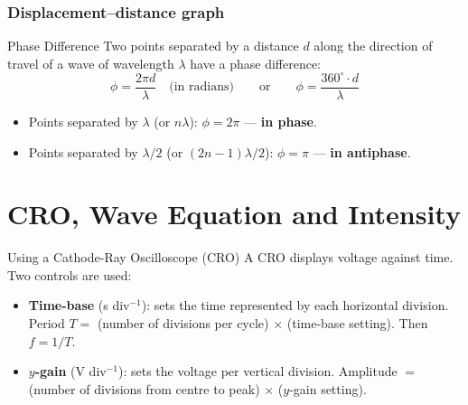\subsubsection*{Displacement--distance graph}

\begin{center}
\end{center}

\begin{keybox}{Phase Difference}
Two points separated by a distance $d$ along the direction of travel of a wave of wavelength $\lambda$ have a phase difference:
$$\phi = \frac{2\pi d}{\lambda} \quad \text{(in radians)} \qquad \text{or} \qquad \phi = \frac{360^\circ \cdot d}{\lambda}$$
\begin{itemize}[itemsep=2pt]
  \item Points separated by $\lambda$ (or $n\lambda$): $\phi = 2\pi$ — \textbf{in phase}.
  \item Points separated by $\lambda/2$ (or $(2n-1)\lambda/2$): $\phi = \pi$ — \textbf{in antiphase}.
\end{itemize}
\end{keybox}

\section{\texorpdfstring{CRO, Wave Equation and Intensity}{CRO, Wave Equation and Intensity}}

\begin{keybox}{Using a Cathode-Ray Oscilloscope (CRO)}
A CRO displays voltage against time. Two controls are used:
\begin{itemize}[itemsep=2pt]
  \item \textbf{Time-base} (s div$^{-1}$): sets the time represented by each horizontal division. Period $T = $ (number of divisions per cycle) $\times$ (time-base setting). Then $f = 1/T$.
  \item \textbf{$y$-gain} (V div$^{-1}$): sets the voltage per vertical division. Amplitude $= $ (number of divisions from centre to peak) $\times$ ($y$-gain setting).
\end{itemize}
\end{keybox}


